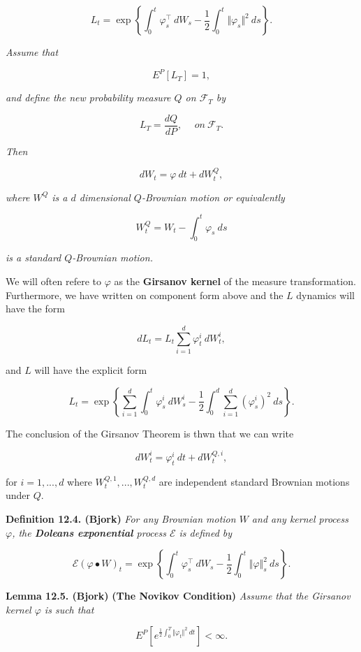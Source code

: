 \documentclass[a4paper,10pt,openany]{book}
\begin{document}
\[
L_t = \exp\left\{\int_0^t \varphi^\top_s\ dW_s - \frac{1}{2}\int_0^t \Vert\varphi_s\Vert ^2\ ds\right\}.
\]

\emph{Assume that}

\[
E^P[L_T]=1,\tag{12.18}
\]

\emph{and define the new probability measure \(Q\) on \(\mathcal{F}_T\) by}

\[
L_T=\frac{dQ}{dP},\hspace{15pt}on\ \mathcal{F}_T.\tag{12.19}
\]

\emph{Then}

\[
dW_t=\varphi\ dt+dW_t^Q,\tag{12.20}
\]

\emph{where \(W^Q\) is a \(d\) dimensional \(Q\)-Brownian motion or equivalently}

\[
W_t^Q=W_t-\int_0^t\varphi_s\ ds\tag{12.21}
\]

\emph{is a standard \(Q\)-Brownian motion.}

We will often refere to \(\varphi\) as the \textbf{Girsanov kernel} of the measure transformation. Furthermore, we have written on component form above and the \(L\) dynamics will have the form

\[
dL_t=L_t\sum_{i=1}^d\varphi^i_t\ dW_t^i,
\]

and \(L\) will have the explicit form

\[
L_t=\exp\left\{\sum_{i=1}^d\int_0^t\varphi^i_s\ dW_s^i - \frac{1}{2}\int_0^d\sum_{i=1}^d(\varphi^i_s)^2\ ds\right\}.
\]

The conclusion of the Girsanov Theorem is thwn that we can write

\[
dW_t^i=\varphi_t^i\ dt+dW_t^{Q,i},
\]

for \(i=1,...,d\) where \(W_t^{Q,1},...,W_t^{Q,d}\) are independent standard Brownian motions under \(Q\).

\textbf{Definition 12.4. (Bjork)} \emph{For any Brownian motion \(W\) and any kernel process \(\varphi\), the \textbf{Doleans exponential} process \(\mathcal{E}\) is defined by}

\[
\mathcal{E}(\varphi\bullet W)_t=\exp\left\{\int_0^t\varphi^\top_s\ dW_s -\frac{1}{2}\int_0^t\Vert \varphi\Vert^2_s\ ds\right\}.\tag{12.24}
\]

\textbf{Lemma 12.5. (Bjork)} \textbf{(The Novikov Condition)} \emph{Assume that the Girsanov kernel \(\varphi\) is such that}

\[
E^P\left[e^{\frac{1}{2}\int_0^T\Vert \varphi_t\Vert^2\ dt}\right]<\infty.\tag{12.27}
\]
\end{document}
